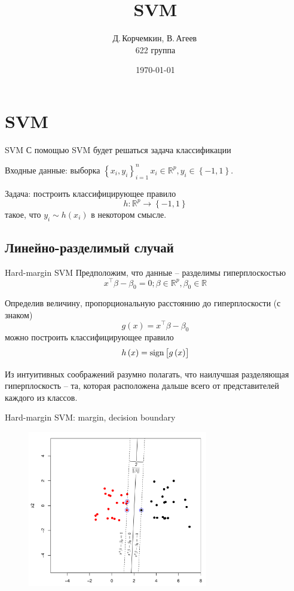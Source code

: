 
\title{SVM}
\author{Д.\,Корчемкин, В.\,Агеев\,\\622 группа}
\date{\today}

\subject{SVM}




\section{SVM}
\begin{frame}{SVM}
	С помощью SVM будет решаться задача классификации

	Входные данные: выборка $\left\{x_i, y_i\right\}_{i=1}^{n}\, x_i \in \mathbb{R}^p, y_i\in\left\{-1,1\right\}$.

	Задача: построить классифицирующее правило 
$$h:\mathbb{R}^p\rightarrow \left\{-1,1\right\}$$
такое, что $y_i\sim h\left(x_i\right)$ в некотором смысле.

\end{frame}


\subsection{Линейно-разделимый случай}
\begin{frame}{Hard-margin SVM}
	Предположим, что данные -- разделимы гиперплоскостью
	$$x^\intercal \beta - \beta_0 = 0; \beta\in\mathbb{R}^p, \beta_0\in\mathbb{R}$$

	Определив величину, пропорциональную расстоянию до гиперплоскости (с знаком)
	$$g\left(x\right)=x^\intercal \beta - \beta_0$$
можно построить классифицирующее правило
	$$h\left(x\right)=\operatorname{sign}\left[g\left(x\right)\right]$$

	Из интуитивных соображений разумно полагать, что наилучшая разделяющая гиперплоскость -- та, которая
расположена дальше всего от представителей каждого из классов.
\end{frame}

\begin{frame}{Hard-margin SVM: margin, decision boundary}
	\begin{figure}
		\includegraphics[width=0.7\textwidth]{plot.png}
	\end{figure}
\end{frame}


